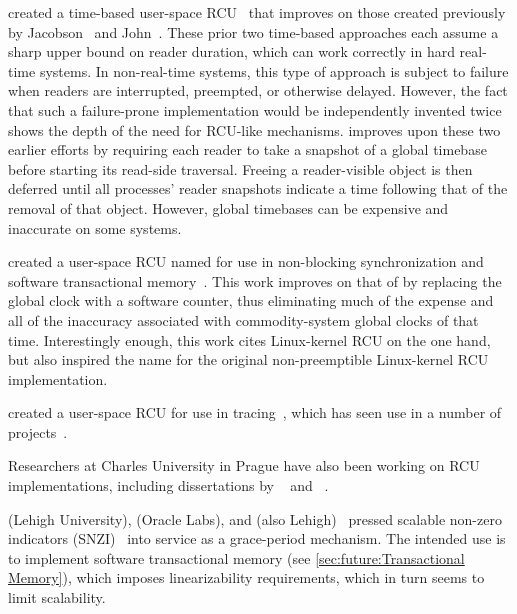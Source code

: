  created a time-based user-space
RCU~\cite{TimothyLHarris2001} that improves on those created previously
by Jacobson~\cite{Jacobson93} and John~\cite{AjuJohn95}.
These prior two time-based approaches each assume a sharp upper bound on
reader duration, which can work correctly in hard real-time systems.
In non-real-time systems, this type of approach is subject to failure
when readers are interrupted, preempted, or otherwise delayed.
However, the fact that such a failure-prone implementation would be
independently invented twice shows the depth of the need for RCU-like
mechanisms.
 improves upon these two earlier efforts by
requiring each reader to take a snapshot of a global timebase before
starting its read-side traversal.
Freeing a reader-visible object is then deferred until all processes'
reader snapshots indicate a time following that of the removal of that object.
However, global timebases can be expensive and inaccurate on some systems.

 created a user-space RCU named  for use in
non-blocking synchronization and software transactional
memory~\cite{KeirAnthonyFraserPhD,UCAM-CL-TR-579,KeirFraser2007withoutLocks}.
This work improves on that of  by replacing the
global clock with a software counter, thus eliminating much of the
expense and all of the inaccuracy associated with commodity-system
global clocks of that time.
Interestingly enough, this work cites Linux-kernel RCU on the one hand,
but also inspired the name  for the original non-preemptible
Linux-kernel RCU implementation.

 created a user-space RCU for use in
tracing~\cite{MathieuDesnoyers2009URCU,MathieuDesnoyersPhD,MathieuDesnoyers2012URCU,PaulMcKenney2013LWNURCU,PaulMcKenney2013LWNURCUhash,PaulMcKenney2013LWNURCUhashAPI,PaulMcKenney2013LWNURCUqueuestack,PaulMcKenney2013LWNURCUqueuestackAPI,PaulMcKenney2013LWNURCUatomicop,PaulMcKenney2013LWNURCUmenagerie,PaulMcKenney2013LWNURCUAPI,PaulMcKenney2013LWNURCUlist,PaulMcKenney2013LWNURCUmenagerieRCU},
which has seen use in a number of projects~\cite{MikeDay2013RCUqemu}.

Researchers at Charles University in Prague have also been
working on RCU implementations, including dissertations by
~\cite{AndrejPodzimek2010masters} and
~\cite{AdamHraska2013RCUHelenOS}.

 (Lehigh University),  (Oracle Labs), and
 (also Lehigh)~\cite{Liu:2013:MSA:2549695.2549732}
pressed scalable non-zero indicators
(SNZI)~\cite{FaithEllen:2007:SNZI} into service as a grace-period
mechanism.
The intended use is to implement software transactional memory
(see \cref{sec:future:Transactional Memory}), which
imposes linearizability requirements, which in turn seems to
limit scalability.

